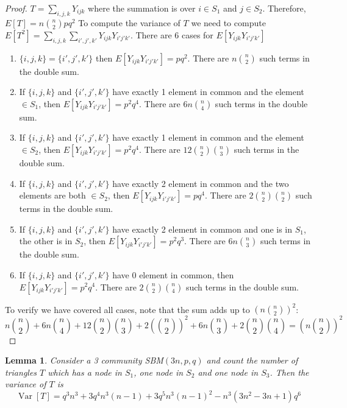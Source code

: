 \documentclass{ctexart}
\newtheorem{lemma}{Lemma}
\DeclareMathOperator{\Var}{Var}
\begin{document}
\begin{proof}
	$T=\sum_{i,j,k} Y_{ijk}$ where the summation is over $i \in S_1$ and $j \in S_2$. Therefore, $E[T] = n\binom{n}{2}pq^2$
	To compute the variance of $T$ we need to compute $E[T^2] = \sum_{i,j,k}\sum_{i',j',k'} Y_{ijk}Y_{i'j'k'}$.
	There are 6 cases for $E[Y_{ijk}Y_{i'j'k'}]$
	\begin{enumerate}
		\item $\{i,j,k\} = \{i',j',k'\}$ then $E[Y_{ijk}Y_{i'j'k'}] = pq^2$.
		There are $n\binom{n}{2}$ such terms in the double sum.
		\item If $\{i,j,k\}$ and $\{i',j',k'\}$ have exactly 1 element in common and the element $\in S_1$, then $E[Y_{ijk}Y_{i'j'k'}] = p^2q^4$.
		There are $6n\binom{n}{4}$ such terms in the double sum.
		\item If $\{i,j,k\}$ and $\{i',j',k'\}$ have exactly 1 element in common and the element $\in S_2$, then $E[Y_{ijk}Y_{i'j'k'}] = p^2q^4$.
		There are $12\binom{n}{2}\binom{n}{3}$ such terms in the double sum.
		\item If $\{i,j,k\}$ and $\{i',j',k'\}$ have exactly 2 element in common and the two elements are both $\in S_2$, then $E[Y_{ijk}Y_{i'j'k'}] = pq^4$.
There are $2\binom{n}{2}\binom{n}{2}$ such terms in the double sum.		
\item If $\{i,j,k\}$ and $\{i',j',k'\}$ have exactly 2 element in common and one is in $S_1$, the other is in $S_2$, then $E[Y_{ijk}Y_{i'j'k'}] = p^2q^3$.
There are $6n\binom{n}{3}$ such terms in the double sum.		
\item If $\{i,j,k\}$ and $\{i',j',k'\}$ have 0 element in common, then $E[Y_{ijk}Y_{i'j'k'}] = p^2q^4$.
There are $2\binom{n}{2}\binom{n}{4}$ such terms in the double sum.		
	\end{enumerate}
To verify we have covered all cases, note that the sum adds up to $(n\binom{n}{2})^2$:
$$
n\binom{n}{2} + 6n\binom{n}{4} + 12\binom{n}{2} \binom{n}{3} + 2(\binom{n}{2})^2 + 6n\binom{n}{3} + 2\binom{n}{2}\binom{n}{4} = \left(n\binom{n}{2}\right)^2
$$
\end{proof}
\begin{lemma}\label{lem:SBM_tr_counting_3}
	Consider a 3 community SBM$(3n, p, q)$ and count the number of triangles $T$ which has a node in $S_1$, one node in $S_2$ and one node in $S_3$.
	Then the variance of $T$ is
	\begin{equation}\label{eq:SBM_tr_counting_three}
	\Var[T] = q^3 n^3 + 3q^4 n^3(n-1) + 3q^5 n^3 (n-1)^2 - n^3(3n^2-3n+1)q^6
	\end{equation}
\end{lemma}
\end{document}
